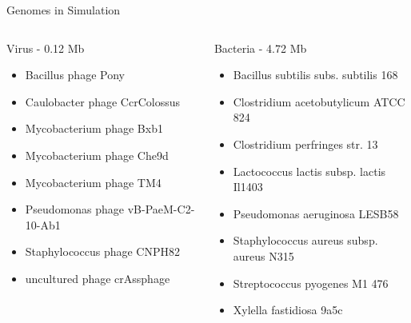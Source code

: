 \documentclass[11pt]{beamer}
\begin{document}
	\begin{frame}{Genomes in Simulation}
	\begin{columns}
			\begin{block}{Virus - 0.12 Mb}
			\begin{itemize}
			\item Bacillus phage Pony
			\item Caulobacter phage CcrColossus
			\item Mycobacterium phage Bxb1
			\item Mycobacterium phage Che9d
			\item Mycobacterium phage TM4
			\item Pseudomonas phage vB-PaeM-C2-10-Ab1
			\item Staphylococcus phage CNPH82
			\item uncultured phage crAssphage
			\end{itemize}
			\end{block}	
			\begin{block}{Bacteria - 4.72 Mb}
			\begin{itemize}
			\item Bacillus subtilis subs. subtilis 168
			\item Clostridium acetobutylicum ATCC 824
			\item Clostridium perfringes str. 13
			\item Lactococcus lactis subsp. lactis Il1403
			\item Pseudomonas aeruginosa LESB58
			\item Staphylococcus aureus subsp. aureus N315
			\item Streptococcus pyogenes M1 476
			\item Xylella fastidiosa 9a5c
			\end{itemize}
			\end{block}
	\end{columns}
	\end{frame}
	
\end{document}
